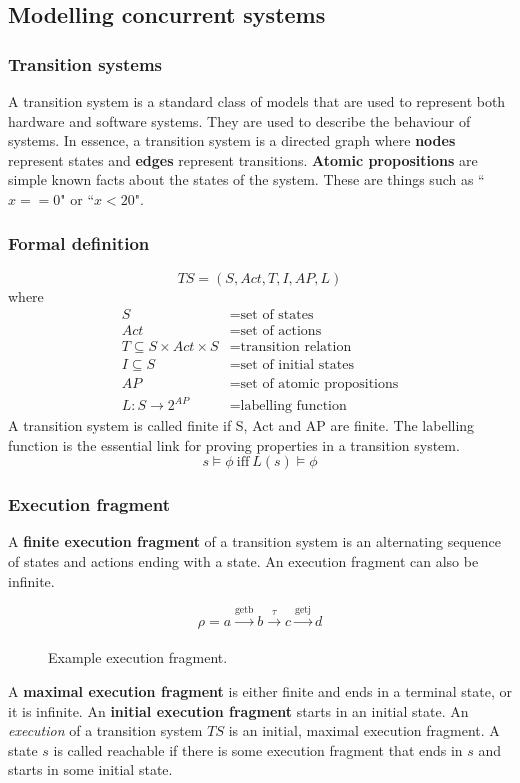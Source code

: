 \documentclass[11pt]{article}
\begin{document}
\subsection{Modelling concurrent systems}
\subsubsection{Transition systems}
A transition system is a standard class of models that are used to represent both hardware and software systems. They are used to describe the behaviour of systems. In essence, a transition system is a directed graph where \textbf{nodes} represent states and \textbf{edges} represent transitions. 
\n
\textbf{Atomic propositions} are simple known facts about the states of the system. These are things such as ``$x == 0$" or ``$x < 20$". 

\subsubsection*{Formal definition}
\begin{equation}
TS = (S, Act, T, I, AP, L)
\end{equation}
where
\begin{align*}
S &= \text{set of states} \\
Act &= \text{set of actions} \\
T \subseteq S \times Act \times S &= \text{transition relation} \\
I \subseteq S &= \text{set of initial states} \\
AP &= \text{set of atomic propositions} \\
L:S \rightarrow 2^{AP} &= \text{labelling function} 
\end{align*}
A transition system is called finite if S, Act and AP are finite.
\n
The labelling function is the essential link for proving properties in a transition system.
\begin{equation}
s \models \phi\ \text{iff}\ L(s) \models \phi
\end{equation}

\subsubsection*{Execution fragment}
A \textbf{finite execution fragment} of a transition system is an alternating sequence of states and actions ending with a state. An execution fragment can also be infinite. 
\begin{figure}[H]
\[ \rho = a \xrightarrow[]{\text{getb}} b \xrightarrow[]{\tau} c \xrightarrow[]{\text{getj}} d \]
\caption{Example execution fragment.}
\end{figure}
\noindent
A \textbf{maximal execution fragment} is either finite and ends in a terminal state, or it is infinite. An \textbf{initial execution fragment} starts in an initial state.
\n
An \textit{execution} of a transition system $TS$ is an initial, maximal execution fragment. A state $s$ is called reachable if there is some execution fragment that ends in $s$ and starts in some initial state.
\end{document}
